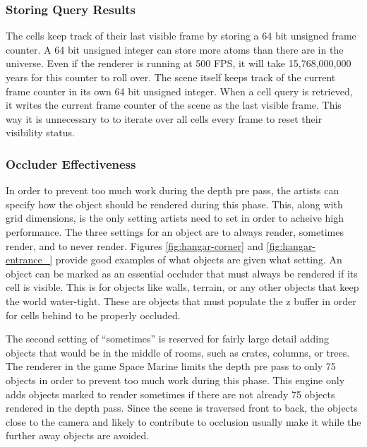 \documentclass[12pt]{ucthesis}
\begin{document}
\subsubsection{Storing Query Results}
\label{storing-query-results}

The cells keep track of their last visible frame by storing a 64 bit unsigned frame counter.
A 64 bit unsigned integer can store more atoms than there are in the universe.
Even if the renderer is running at 500 FPS, it will take 15,768,000,000 years for this counter to roll over.
The scene itself keeps track of the current frame counter in its own 64 bit unsigned integer.
When a cell query is retrieved, it writes the current frame counter of the scene as the last visible frame.
This way it is unnecessary to to iterate over all cells every frame to reset their visibility status.

\subsubsection{Occluder Effectiveness}
\label{occluder-effectiveness}

In order to prevent too much work during the depth pre pass, the artists can specify how the object should be rendered during this phase.
This, along with grid dimensions, is the only setting artists need to set in order to acheive high performance.
The three settings for an object are to always render, sometimes render, and to never render.
Figures \ref{fig:hangar-corner} and \ref{fig:hangar-entrance_} provide good examples of what objects are given what setting.
An object can be marked as an essential occluder that must always be rendered if its cell is visible.
This is for objects like walls, terrain, or any other objects that keep the world water-tight.
These are objects that must populate the z buffer in order for cells behind to be properly occluded.

The second setting of ``sometimes'' is reserved for fairly large detail adding objects that would be in the middle of rooms, such as crates, columns, or trees.
The renderer in the game Space Marine limits the depth pre pass to only 75 objects in order to prevent too much work during this phase.\cite{spaceMarine}
This engine only adds objects marked to render sometimes if there are not already 75 objects rendered in the depth pass.
Since the scene is traversed front to back, the objects close to the camera and likely to contribute to occlusion usually make it while the further away objects are avoided.
\end{document}
